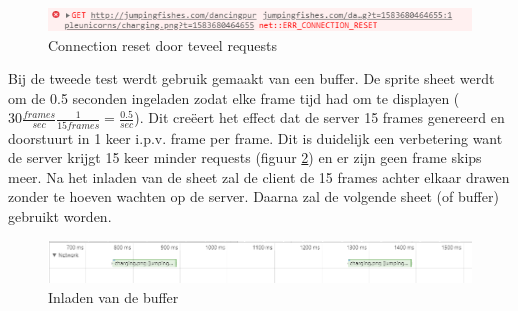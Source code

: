 \begin{figure}[H]
\centering
\includegraphics[scale=0.7]{img/reset.png}
\caption{Connection reset door teveel requests} \label{reset}
\end{figure}

Bij de tweede test werdt gebruik gemaakt van een buffer. De sprite sheet werdt om de 0.5 seconden ingeladen zodat elke frame tijd had om te displayen ($30 \frac{frames}{sec} \frac{1}{15 frames} = \frac{0.5}{sec} $). Dit creëert het effect dat de server 15 frames genereerd en doorstuurt in 1 keer i.p.v. frame per frame. Dit is duidelijk een verbetering want de server krijgt 15 keer minder requests (figuur \ref{inladen2}) en er zijn geen frame skips meer. Na het inladen van de sheet zal de client de 15 frames achter elkaar drawen zonder te hoeven wachten op de server. Daarna zal de volgende sheet (of buffer) gebruikt worden.

\begin{figure}[H]
\centering
\includegraphics[scale=0.7]{img/inladen2.png}
\caption{Inladen van de buffer} \label{inladen2}
\end{figure}




